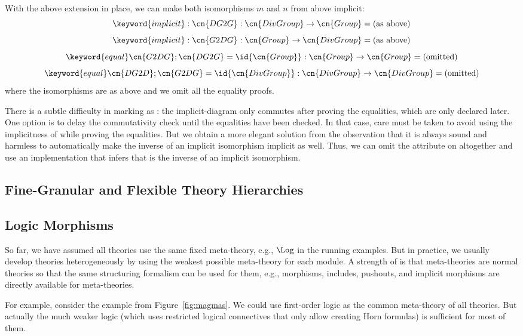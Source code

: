 \begin{example}[Isomorphisms]
With the above extension in place, we can make both isomorphisms $m$ and $n$ from above implicit:
\[\keyword{implicit}:\cn{DG2G}:\cn{DivGroup}\to\cn{Group}=\text{(as above)}\]
\[\keyword{implicit}:\cn{G2DG}:\cn{Group}\to\cn{DivGroup}=\text{(as above)}\]
\[\keyword{equal}\cn{G2DG};\cn{DG2G}=\id{\cn{Group}}:\cn{Group}\to\cn{Group}=\text{(omitted)}\]
\[\keyword{equal}\cn{DG2D};\cn{G2DG}=\id{\cn{DivGroup}}:\cn{DivGroup}\to\cn{DivGroup}=\text{(omitted)}\]
where the isomorphisms are as above and we omit all the equality proofs.

There is a subtle difficulty in marking  as : the implicit-diagram only commutes after proving the equalities, which are only declared later.
One option is to delay the commutativity check until the equalities have been checked.
In that case, care must be taken to avoid using the implicitness of  while proving the equalities.
But we obtain a more elegant solution from the observation that it is always sound and harmless to automatically make the inverse of an implicit isomorphism implicit as well.
Thus, we can omit the attribute  on  altogether and use an implementation that infers that  is the inverse of an implicit isomorphism.
\end{example}

\subsection{Fine-Granular and Flexible Theory Hierarchies}\label{sec:granular}


\subsection{Logic Morphisms}

So far, we have assumed all theories use the same fixed meta-theory, e.g., $\Log$ in the running examples.
But in practice, we usually develop theories heterogeneously by using the weakest possible meta-theory for each module.
A strength of \mmt is that meta-theories are normal theories so that the same structuring formalism can be used for them, e.g., morphisms, includes, pushouts, and implicit morphisms are directly available for meta-theories.

For example, consider the example from Figure~\ref{fig:magmas}.
We could use first-order logic  as the common meta-theory of all theories.
But actually the much weaker logic  (which uses restricted logical connectives that only allow creating Horn formulas) is sufficient for most of them.

